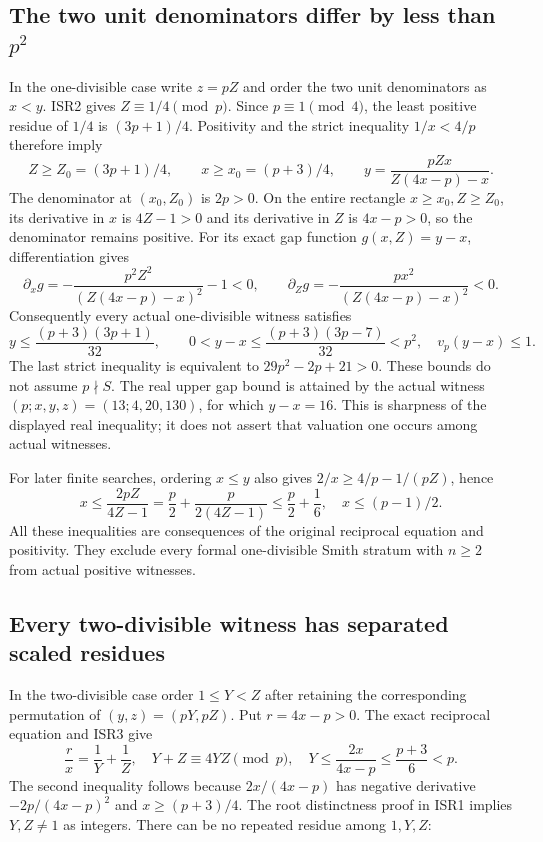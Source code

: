 \documentclass[11pt]{article}
\begin{document}
\subsection{The two unit denominators differ by less than $p^2$}
In the one-divisible case write $z=pZ$ and order the two unit denominators
as $x<y$. ISR2 gives $Z\equiv1/4\pmod p$. Since $p\equiv1\pmod4$,
the least positive residue of $1/4$ is $(3p+1)/4$. Positivity and the
strict inequality $1/x<4/p$ therefore imply
\begin{equation}
 Z\ge Z_0=(3p+1)/4,\qquad x\ge x_0=(p+3)/4,\qquad
 y=\frac{pZx}{Z(4x-p)-x}.                                \tag{PES1}
\end{equation}
The denominator at $(x_0,Z_0)$ is $2p>0$. On the entire rectangle
$x\ge x_0,Z\ge Z_0$, its derivative in $x$ is $4Z-1>0$ and its
derivative in $Z$ is $4x-p>0$, so the denominator remains positive.
For its exact gap function $g(x,Z)=y-x$, differentiation gives
\begin{equation}
 \partial_x g=-\frac{p^2Z^2}{(Z(4x-p)-x)^2}-1<0,\qquad
 \partial_Z g=-\frac{p x^2}{(Z(4x-p)-x)^2}<0.             \tag{PES2}
\end{equation}
Consequently every actual one-divisible witness satisfies
\begin{equation}
 y\le\frac{(p+3)(3p+1)}{32},\qquad
 0<y-x\le\frac{(p+3)(3p-7)}{32}<p^2,
 \quad v_p(y-x)\le1.                                  \tag{PES3}
\end{equation}
The last strict inequality is equivalent to
$29p^2-2p+21>0$. These bounds do not assume $p\nmid S$.
The real upper gap bound is attained by the actual witness
$(p;x,y,z)=(13;4,20,130)$, for which $y-x=16$.
This is sharpness of the displayed real inequality; it does not
assert that valuation one occurs among actual witnesses.

For later finite searches, ordering $x\le y$ also gives
$2/x\ge4/p-1/(pZ)$, hence
\begin{equation}
 x\le\frac{2pZ}{4Z-1}
   =\frac p2+\frac{p}{2(4Z-1)}
   \le\frac p2+\frac16,
 \quad x\le(p-1)/2.                                    \tag{PES4}
\end{equation}
All these inequalities are consequences of the original reciprocal
equation and positivity. They exclude every formal one-divisible
Smith stratum with $n\ge2$ from actual positive witnesses.

\subsection{Every two-divisible witness has separated scaled residues}
In the two-divisible case order $1\le Y<Z$ after retaining the
corresponding permutation of $(y,z)=(pY,pZ)$. Put $r=4x-p>0$.
The exact reciprocal equation and ISR3 give
\begin{equation}
 \frac r x=\frac1Y+\frac1Z,\quad
 Y+Z\equiv4YZ\pmod p,
 \quad Y\le\frac{2x}{4x-p}\le\frac{p+3}{6}<p.           \tag{PES5}
\end{equation}
The second inequality follows because $2x/(4x-p)$ has negative
derivative $-2p/(4x-p)^2$ and $x\ge(p+3)/4$.
The root distinctness proof in ISR1 implies $Y,Z\ne1$ as integers.
There can be no repeated residue among $1,Y,Z$:
\end{document}
